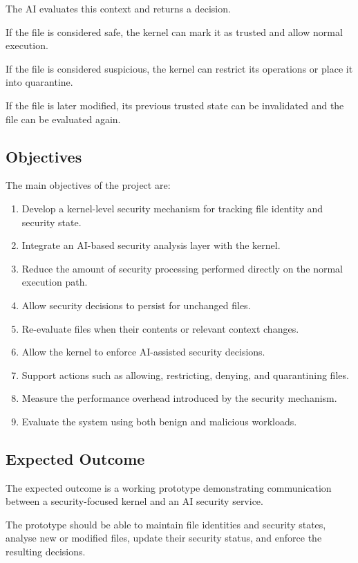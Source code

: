 The AI evaluates this context and returns a decision.

If the file is considered safe, the kernel can mark it as trusted and allow normal execution.

If the file is considered suspicious, the kernel can restrict its operations or place it into quarantine.

If the file is later modified, its previous trusted state can be invalidated and the file can be evaluated again.

\subsection{Objectives}

The main objectives of the project are:

\begin{enumerate}
    \item Develop a kernel-level security mechanism for tracking file identity and security state.
    \item Integrate an AI-based security analysis layer with the kernel.
    \item Reduce the amount of security processing performed directly on the normal execution path.
    \item Allow security decisions to persist for unchanged files.
    \item Re-evaluate files when their contents or relevant context changes.
    \item Allow the kernel to enforce AI-assisted security decisions.
    \item Support actions such as allowing, restricting, denying, and quarantining files.
    \item Measure the performance overhead introduced by the security mechanism.
    \item Evaluate the system using both benign and malicious workloads.
\end{enumerate}

\subsection{Expected Outcome}

The expected outcome is a working prototype demonstrating communication between a security-focused kernel and an AI security service.

The prototype should be able to maintain file identities and security states, analyse new or modified files, update their security status, and enforce the resulting decisions.

